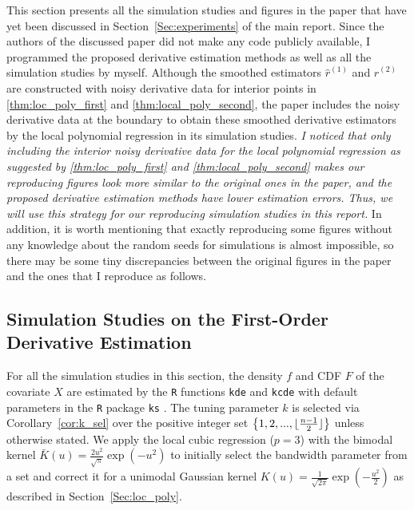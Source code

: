 \documentclass{uwstat572}
\theoremstyle{definition}
\DeclarePairedDelimiter\floor{\lfloor}{\rfloor}
\renewcommand{\hat}{\widehat}
\theoremstyle{theorem}
\begin{document}
This section presents all the simulation studies and figures in the paper \citep{liu2020smoothed} that have yet been discussed in Section~\ref{Sec:experiments} of the main report. Since the authors of the discussed paper did not make any code publicly available, I programmed the proposed derivative estimation methods as well as all the simulation studies by myself. Although the smoothed estimators $\hat{r}^{(1)}$ and $\hat{r}^{(2)}$ are constructed with noisy derivative data for interior points in \autoref{thm:loc_poly_first} and \autoref{thm:local_poly_second}, the paper includes the noisy derivative data at the boundary to obtain these smoothed derivative estimators by the local polynomial regression in its simulation studies. \emph{I noticed that only including the interior noisy derivative data for the local polynomial regression as suggested by \autoref{thm:loc_poly_first} and \autoref{thm:local_poly_second} makes our reproducing figures look more similar to the original ones in the paper, and the proposed derivative estimation methods have lower estimation errors. Thus, we will use this strategy for our reproducing simulation studies in this report.} In addition, it is worth mentioning that exactly reproducing some figures without any knowledge about the random seeds for simulations is almost impossible, so there may be some tiny discrepancies between the original figures in the paper and the ones that I reproduce as follows.

\subsection{Simulation Studies on the First-Order Derivative Estimation}

For all the simulation studies in this section, the density $f$ and CDF $F$ of the covariate $X$ are estimated by the \texttt{R} functions \texttt{kde} and \texttt{kcde} with default parameters in the \texttt{R} package \texttt{ks} \citep{ks2022R}. The tuning parameter $k$ is selected via Corollary~\ref{cor:k_sel} over the positive integer set $\left\{1,2,...,\floor{\frac{n-1}{2}}\right\}$ unless otherwise stated. We apply the local cubic regression ($p=3$) with the bimodal kernel $\bar{K}(u)=\frac{2u^2}{\sqrt{\pi}} \exp\left(-u^2\right)$ to initially select the bandwidth parameter from a set and correct it for a unimodal Gaussian kernel $K(u)=\frac{1}{\sqrt{2\pi}} \exp\left(-\frac{u^2}{2}\right)$ as described in Section~\ref{Sec:loc_poly}.
\end{document}
